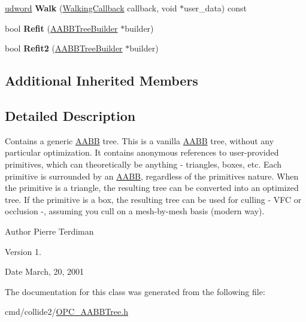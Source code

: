 \begin{DoxyCompactItemize}
\item 
\hyperlink{IceTypes_8h_a44c6f1920ba5551225fb534f9d1a1733}{udword} {\bfseries Walk} (\hyperlink{OPC__AABBTree_8h_a4064dc9ce0892a5ebe07b5c8ec13568a}{Walking\+Callback} callback, void $\ast$user\+\_\+data) const \hypertarget{classAABBTree_a992607fb1f96ca3e378f0b465e49785b}{}\label{classAABBTree_a992607fb1f96ca3e378f0b465e49785b}

\item 
bool {\bfseries Refit} (\hyperlink{classAABBTreeBuilder}{A\+A\+B\+B\+Tree\+Builder} $\ast$builder)\hypertarget{classAABBTree_a833fbf09b1989a73f852dfaf30e33546}{}\label{classAABBTree_a833fbf09b1989a73f852dfaf30e33546}

\item 
bool {\bfseries Refit2} (\hyperlink{classAABBTreeBuilder}{A\+A\+B\+B\+Tree\+Builder} $\ast$builder)\hypertarget{classAABBTree_a78b55dd9239d8ec9505f79b0601a8b1c}{}\label{classAABBTree_a78b55dd9239d8ec9505f79b0601a8b1c}

\end{DoxyCompactItemize}
\subsection*{Additional Inherited Members}


\subsection{Detailed Description}
Contains a generic \hyperlink{classAABB}{A\+A\+BB} tree. This is a vanilla \hyperlink{classAABB}{A\+A\+BB} tree, without any particular optimization. It contains anonymous references to user-\/provided primitives, which can theoretically be anything -\/ triangles, boxes, etc. Each primitive is surrounded by an \hyperlink{classAABB}{A\+A\+BB}, regardless of the primitive\textquotesingle{}s nature. When the primitive is a triangle, the resulting tree can be converted into an optimized tree. If the primitive is a box, the resulting tree can be used for culling -\/ V\+FC or occlusion -\/, assuming you cull on a mesh-\/by-\/mesh basis (modern way).

\begin{DoxyAuthor}{Author}
Pierre Terdiman 
\end{DoxyAuthor}
\begin{DoxyVersion}{Version}
1. 
\end{DoxyVersion}
\begin{DoxyDate}{Date}
March, 20, 2001 
\end{DoxyDate}


The documentation for this class was generated from the following file\+:\begin{DoxyCompactItemize}
\item 
cmd/collide2/\hyperlink{OPC__AABBTree_8h}{O\+P\+C\+\_\+\+A\+A\+B\+B\+Tree.\+h}\end{DoxyCompactItemize}
